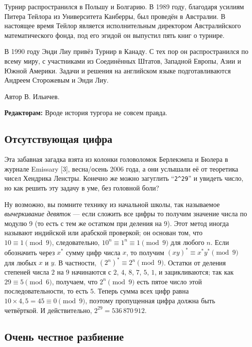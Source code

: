 Турнир распространился в Польшу и Болгарию.
В 1989 году, благодаря усилиям Питера Тейлора из Университета Канберры, был проведён в Австралии.
В настоящее время Тейлор является исполнительным директором Австралийского математического фонда, под его эгидой он выпустил пять книг о турнире.

В 1990 году Энди Лиу привёз Турнир в Канаду.
С тех пор он распространился по всему миру, с участниками из Соединённых Штатов, Западной Европы, Азии и Южной Америки.
Задачи и решения на английском языке подготавливаются Андреем Сторожевым и Энди Лиу.

\begin{addedbytheeditors}
Автор В. Ильичев.

\textbf{Редакторам:} Вроде история тургора не совсем правда.
\end{addedbytheeditors}

\subsection*{Отсутствующая цифра}

Эта забавная загадка взята из колонки головоломок Берлекэмпа и Бюлера в журнале Emissary [3], весна/осень 2006 года,
а они услышали её от теоретика чисел Хендрика Ленстры.
Конечно же можно загуглить ``\texttt{2\^{}29}'' и увидеть число, но как решить эту задачу в уме, без головной боли?

Ну возможно, вы помните технику из начальной школы, так называемое \emph{вычеркивание девяток} --- если сложить все цифры то получим значение числа по модулю 9 (то есть  с тем же остатком при деления на 9).
Этот метод иногда называют индийской или арабской проверкой;
он основан том, что $10 \equiv 1 \pmod 9$, следовательно, $10^n \equiv 1^n \equiv 1 \pmod 9$ для любого $n$.
Если обозначить через $x^*$ сумму цифр числа $x$, то получим $(xy)^* \equiv x^* y^* \pmod 9$ для любых $x$ и $y$.
В частности, $(2^n)^* \equiv 2^n \pmod 9$.
Остатки от деления степеней числа $2$ на $9$ начинаются с $2$, $4$, $8$, $7$, $5$, $1$, и зацикливаются;
так как $29 \equiv 5 \pmod 6$, получаем, что $2^n \pmod 9$ есть пятое число этой последовательности, то есть $5$.
Теперь сумма всех цифр равна $10 \times 4{,}5 = 45 \equiv 0 \pmod 9$, поэтому пропущенная цифра должна быть четвёрткой.
И действительно, $2^{29} = 536\,870\,912$.

\subsection*{Очень честное разбиение}

